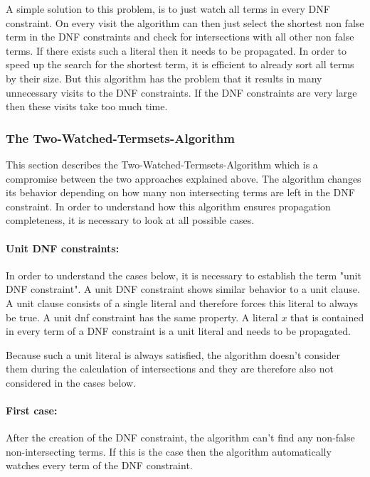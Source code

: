 \documentclass{easychair}
\begin{document}
A simple solution to this problem, is to just watch all terms in every DNF constraint.
On every visit the algorithm can then just select the shortest non false term in the DNF constraints and check for intersections with all other non false terms. If there exists such a literal then it needs to be propagated. In order to speed up the search for the shortest term, it is efficient to already sort all terms by their size. But this algorithm has the problem that it results in many unnecessary visits to the DNF constraints. If the DNF constraints are very large then these visits take too much time.

\subsubsection{The Two-Watched-Termsets-Algorithm}

This section describes the Two-Watched-Termsets-Algorithm which is a compromise between the two approaches explained above. The algorithm changes its behavior depending on how many non intersecting terms are left in the DNF constraint. In order to understand how this algorithm ensures propagation completeness, it is necessary to look at all possible cases.

\paragraph{Unit DNF constraints:} In order to understand the cases below, it is necessary to establish the term "unit DNF constraint". A unit DNF constraint shows similar behavior to a unit clause. A unit clause consists of a single literal and therefore forces this literal to always be true. A unit dnf constraint has the same property.
A literal $x$ that is contained in every term of a DNF constraint is a unit literal and needs to be propagated.

Because such a unit literal is always satisfied, the algorithm doesn't consider them during the calculation of intersections and they are therefore also not considered in the cases below.


\paragraph{First case:} After the creation of the DNF constraint, the algorithm can't find any non-false non-intersecting terms. If this is the case then the algorithm automatically watches every term of the DNF constraint.
\end{document}
